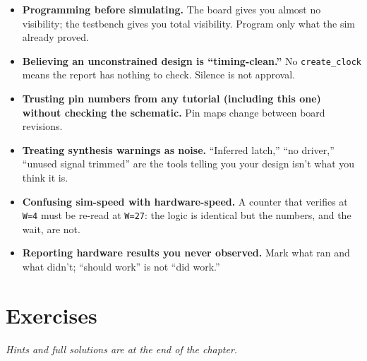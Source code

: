 \begin{itemize}
\item \textbf{Programming before simulating.} The board gives you almost no
visibility; the testbench gives you total visibility. Program only what the
sim already proved.
\item \textbf{Believing an unconstrained design is ``timing-clean.''} No
\texttt{create\_clock} means the report has nothing to check. Silence is not
approval.
\item \textbf{Trusting pin numbers from any tutorial (including this one)
without checking the schematic.} Pin maps change between board revisions.
\item \textbf{Treating synthesis warnings as noise.} ``Inferred latch,'' ``no
driver,'' ``unused signal trimmed'' are the tools telling you your design
isn't what you think it is.
\item \textbf{Confusing sim-speed with hardware-speed.} A counter that
verifies at \texttt{W=4} must be re-read at \texttt{W=27}: the logic is
identical but the numbers, and the wait, are not.
\item \textbf{Reporting hardware results you never observed.} Mark what ran
and what didn't; ``should work'' is not ``did work.''
\end{itemize}

\section*{Exercises}

\emph{Hints and full solutions are at the end of the chapter.}

